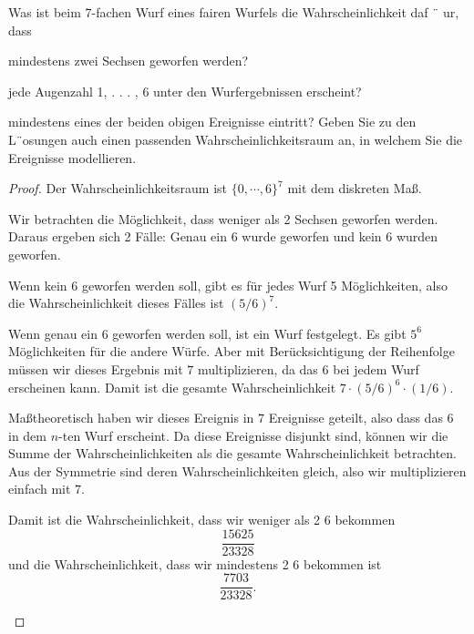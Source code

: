 \begin{Problem}
Was ist beim 7-fachen Wurf eines fairen Wurfels die Wahrscheinlichkeit daf ¨ ur, dass	
\begin{parts}
\item mindestens zwei Sechsen geworfen werden?
\item jede Augenzahl 1, . . . , 6 unter den Wurfergebnissen erscheint?
\item mindestens eines der beiden obigen Ereignisse eintritt?
Geben Sie zu den L¨osungen auch einen passenden Wahrscheinlichkeitsraum an, in welchem Sie die Ereignisse modellieren.
\end{parts}
\end{Problem}
\begin{proof}
	Der Wahrscheinlichkeitsraum ist $\{0,\cdots, 6\}^7$ mit dem diskreten Maß.
	\begin{parts}
	\item Wir betrachten die Möglichkeit, dass weniger als 2 Sechsen geworfen werden. Daraus ergeben sich 2 Fälle: Genau ein $6$ wurde geworfen und kein $6$ wurden geworfen. 

		Wenn kein $6$ geworfen werden soll, gibt es für jedes Wurf 5 Möglichkeiten, also die Wahrscheinlichkeit dieses Fälles ist $(5 / 6)^7$.

		Wenn genau ein $6$ geworfen werden soll, ist ein Wurf festgelegt. Es gibt $5^6$ Möglichkeiten für die andere Würfe. Aber mit Berücksichtigung der Reihenfolge müssen wir dieses Ergebnis mit $7$ multiplizieren, da das $6$ bei jedem Wurf erscheinen kann. Damit ist die gesamte Wahrscheinlichkeit $7\cdot (5 / 6)^6 \cdot (1 / 6)$.

		Maßtheoretisch haben wir dieses Ereignis in $7$ Ereignisse geteilt, also dass das $6$ in dem $n$-ten Wurf erscheint. Da diese Ereignisse disjunkt sind, können wir die Summe der Wahrscheinlichkeiten als die gesamte Wahrscheinlichkeit betrachten. Aus der Symmetrie sind deren Wahrscheinlichkeiten gleich, also wir multiplizieren einfach mit $7$. 
	
Damit ist die Wahrscheinlichkeit, dass wir weniger als 2 $6$ bekommen
\[\frac{15625}{23328}\]
und die Wahrscheinlichkeit, dass wir mindestens 2 $6$ bekommen ist
\[
\frac{7703}{23328}
.\] 
	\end{parts}
\end{proof}
